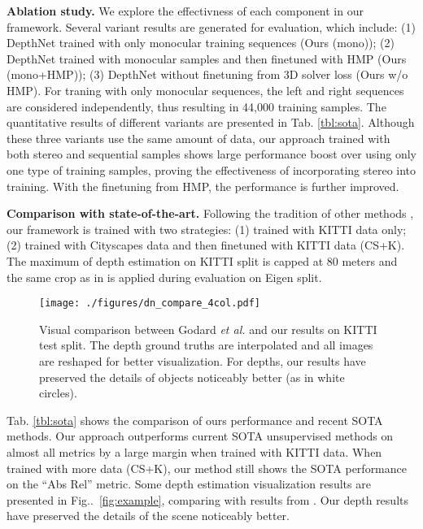 \documentclass[runningheads]{llncs}
\makeatletter
\newcommand{\figref}[1]{Fig\onedot~\ref{#1}}
\DeclareRobustCommand\onedot{\futurelet\@let@token\@onedot}
\def\onedot{\ifx\@let@token.\else.\null\fi\xspace}
\def\etal{\emph{et al.}}
\makeatother
\begin{document}
\vspace{0.5\baselineskip}
\noindent\textbf{Ablation study.}
We explore the effectivness of each component in our framework. Several variant results are generated for evaluation, which include: (1) DepthNet trained with only monocular training sequences (Ours (mono)); (2) DepthNet trained with monocular samples and then finetuned with HMP (Ours (mono+HMP)); (3) DepthNet without finetuning from 3D solver loss (Ours w/o HMP). For traning with only monocular sequences, the left and right sequences are considered independently, thus resulting in 44,000 training samples. The quantitative results of different variants are presented in Tab. \ref{tbl:sota}. Although these three variants use the same amount of data, our approach trained with both stereo and sequential samples shows large performance boost over using only one type of training samples, proving the effectiveness of incorporating stereo into training. With the finetuning from HMP, the performance is further improved. 

\vspace{0.5\baselineskip}
\noindent\textbf{Comparison with state-of-the-art.}
Following the tradition of other methods \cite{eigen2014depth,zhou2017unsupervised,godard2016unsupervised}, our framework is trained with two strategies: (1) trained with KITTI data only; (2) trained with Cityscapes data and then finetuned with KITTI data (CS+K). The maximum of depth estimation on KITTI split is capped at 80 meters and the same crop as in \cite{eigen2014depth} is applied during evaluation on Eigen split. 

\begin{figure*}
\vspace{-0.5\baselineskip}
\centering
\texttt{[image: ./figures/dn\_compare\_4col.pdf]}
\caption{Visual comparison between Godard \etal \protect\cite{godard2016unsupervised} and our results on KITTI test split. The depth ground truths are interpolated and all images are reshaped for better visualization. For depths, our results have preserved the details of objects noticeably better (as in white circles).}
\label{fig:examples}
\vspace{-0.8\baselineskip}
\end{figure*}

Tab. \ref{tbl:sota} shows the comparison of ours performance and recent SOTA methods. Our approach outperforms current SOTA unsupervised methods \cite{zhou2017unsupervised,kuznietsov2017semi,yang2018cvpr,godard2016unsupervised} on almost all metrics by a large margin when trained with KITTI data. When trained with more data (CS+K), our method still shows the SOTA performance on the ``Abs Rel'' metric. Some depth estimation visualization results are presented in \figref{fig:example}, comparing with results from \cite{godard2016unsupervised}. Our depth results have preserved the details of the scene noticeably better.
\end{document}
